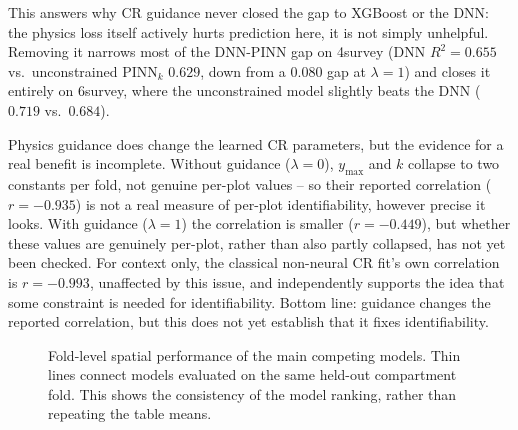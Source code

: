This answers why CR guidance never closed the gap to XGBoost or the DNN: the physics loss itself
actively hurts prediction here, it is not simply unhelpful. Removing it narrows most of the
DNN-PINN gap on 4survey (DNN $R^2=0.655$ vs.\ unconstrained PINN$_k$ $0.629$, down from a $0.080$
gap at $\lambda=1$) and closes it entirely on 6survey, where the unconstrained model slightly
beats the DNN ($0.719$ vs.\ $0.684$).

Physics guidance does change the learned CR parameters, but the evidence for a real benefit is
incomplete. Without guidance ($\lambda=0$), $y_{\max}$ and $k$ collapse to two constants per fold,
not genuine per-plot values -- so their reported correlation ($r=-0.935$) is not a real measure of
per-plot identifiability, however precise it looks. With guidance ($\lambda=1$) the correlation is
smaller ($r=-0.449$), but whether these values are genuinely per-plot, rather than also partly
collapsed, has not yet been checked. For context only, the classical non-neural CR fit's own
correlation is $r=-0.993$, unaffected by this issue, and independently supports the idea that some
constraint is needed for identifiability. Bottom line: guidance changes the reported correlation,
but this does not yet establish that it fixes identifiability.


\begin{figure}[!htbp]
\centering
{}
\caption{Fold-level spatial performance of the main competing models. Thin lines connect models
evaluated on the same held-out compartment fold. This shows the consistency of the model ranking,
rather than repeating the table means.}
\label{fig:rq1-fold-performance}
\end{figure}

